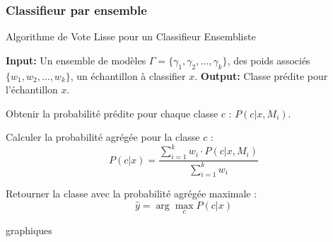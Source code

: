 \documentclass{article}
\begin{document}
\subsubsection{Classifieur par ensemble}
\begin{algorithm}
\caption{Algorithme de Vote Lisse pour un Classifieur Ensembliste}
\begin{algorithmic}[1]
\STATE \textbf{Input:} Un ensemble de modèles  $\Gamma = \{\gamma_1, \gamma_2, \dots, \gamma_k\}$, des poids associés $\{w_1, w_2, \dots, w_k\}$, un échantillon à classifier $x$.
\STATE \textbf{Output:} Classe prédite pour l'échantillon $x$.

    \STATE Obtenir la probabilité prédite pour chaque classe $c$ : $P(c|x, M_i)$.
\ENDFOR

    \STATE Calculer la probabilité agrégée pour la classe $c$ :
    \[
    P(c|x) = \frac{\sum_{i=1}^k w_i \cdot P(c|x, M_i)}{\sum_{i=1}^k w_i}
    \]
\ENDFOR

\STATE Retourner la classe avec la probabilité agrégée maximale :
\[
\hat{y} = \arg\max_c P(c|x)
\]
\end{algorithmic}
\end{algorithm}
graphiques
\end{document}
